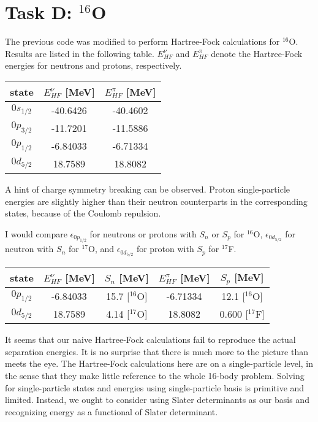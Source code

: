 \documentclass[11pt, oneside]{article}   	%
\begin{document}
\section{Task D: $^{16}$O}
The previous code was modified to perform Hartree-Fock calculations for $^{16}$O. Results are listed in the following table. $E_{HF}^{\nu}$ and $E_{HF}^{\pi}$ denote the Hartree-Fock energies for neutrons and protons, respectively.
\begin{table}[H]
  \centering
\begin{tabular}{ccc}
  \toprule
	state & \textit{$E_{HF}^{\nu}$} [MeV] & \textit{$E_{HF}^{\pi}$} [MeV] \\
  \midrule
	$0s_{1/2}$ & -40.6426 & -40.4602\\
	$0p_{3/2}$ & -11.7201 & -11.5886 \\
	$0p_{1/2}$ & -6.84033 & -6.71334 \\
	$0d_{5/2}$ & 18.7589 & 18.8082 \\   
	\bottomrule
  \end{tabular}
\end{table}

A hint of charge symmetry breaking can be observed. Proton single-particle energies are slightly higher than their neutron counterparts in the corresponding states, because of the Coulomb repulsion.

I would compare $\epsilon_{0p_{1/2}}$ for neutrons or protons with $S_n$ or $S_p$ for $^{16}$O, $\epsilon_{0d_{5/2}}$ for neutron with $S_n$ for $^{17}$O, and $\epsilon_{0d_{5/2}}$ for proton with $S_p$ for $^{17}$F.

\begin{table}[H]
  \centering
\begin{tabular}{ccccc}
  \toprule
	state & \textit{$E_{HF}^{\nu}$} [MeV] & $S_n$ [MeV] & \textit{$E_{HF}^{\pi}$} [MeV] & $S_p$ [MeV] \\
  \midrule
	$0p_{1/2}$ & -6.84033 & 15.7 [$^{16}$O] & -6.71334 & 12.1 [$^{16}$O] \\
	$0d_{5/2}$ & 18.7589 & 4.14 [$^{17}$O] & 18.8082 & 0.600 [$^{17}$F] \\    
	\bottomrule
  \end{tabular}
\end{table}

It seems that our naive Hartree-Fock calculations fail to reproduce the actual separation energies. It is no surprise that there is much more to the picture than meets the eye. The Hartree-Fock calculations here are on a single-particle level, in the sense that they make little reference to the whole 16-body problem. Solving for single-particle states and energies using single-particle basis is primitive and limited. Instead, we ought to consider using Slater determinants as our basis and recognizing energy as a functional of Slater determinant. 
\end{document}

